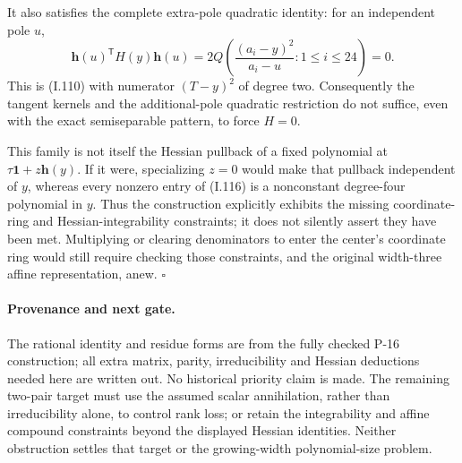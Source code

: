It also satisfies the complete extra-pole quadratic identity:
for an independent pole $u$,
\[
 \mathbf h(u)^{\mathsf T}H(y)\mathbf h(u)
 =2Q\left(\frac{(a_i-y)^2}{a_i-u}:1\le i\le24\right)=0.
 \tag{I.118}
\]
This is (I.110) with numerator $(T-y)^2$ of degree two.
Consequently the tangent kernels and the additional-pole
quadratic restriction do not suffice, even with the exact
semiseparable pattern, to force $H=0$.

This family is not itself the Hessian pullback of a fixed
polynomial at $\tau\mathbf1+z\mathbf h(y)$. If it were,
specializing $z=0$ would make that pullback independent of $y$,
whereas every nonzero entry of (I.116) is a nonconstant
degree-four polynomial in $y$. Thus the construction explicitly
exhibits the missing coordinate-ring and Hessian-integrability
constraints; it does not silently assert they have been met.
Multiplying or clearing denominators to enter the center's
coordinate ring would still require checking those constraints,
and the original width-three affine representation, anew.
\hfill$\square$

\paragraph{Provenance and next gate.}
The rational identity and residue forms are from the fully
checked P-16 construction; all extra matrix, parity, irreducibility
and Hessian deductions needed here are written out. No historical
priority claim is made. The remaining two-pair target must use
the assumed scalar annihilation, rather than irreducibility
alone, to control rank loss; or retain the integrability and
affine compound constraints beyond the displayed Hessian
identities. Neither obstruction settles that target or the
growing-width polynomial-size problem.
